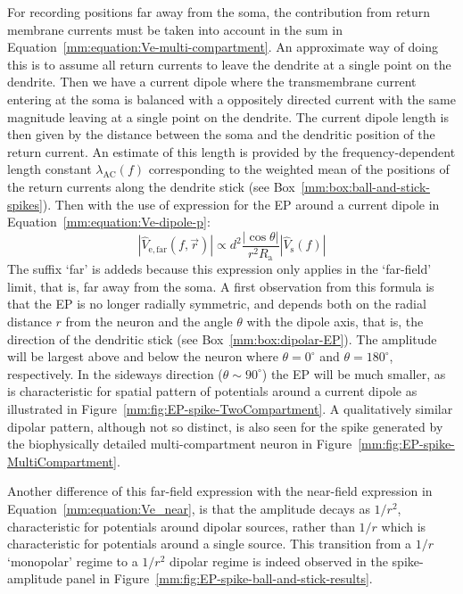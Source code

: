 For recording positions far away from the soma, the contribution from return membrane currents must be taken into
account in the sum in Equation~\ref{mm:equation:Ve-multi-compartment}. An approximate way of doing this is to
assume all return currents to leave the dendrite at a single point on the dendrite. Then we have 
a current dipole where the transmembrane current entering at the soma is balanced with a oppositely directed current
with the same magnitude leaving at a single point on the dendrite. The current dipole length is then given by the distance
between the soma and the dendritic position of the return current. An estimate of this length is provided by the 
frequency-dependent length constant  $\lambda_\mathrm{AC}(f)$  corresponding to the weighted mean of the positions of the return currents along
the dendrite stick (see Box~\ref{mm:box:ball-and-stick-spikes}). 
Then with the use of expression for the EP around a current dipole in 
Equation~\ref{mm:equation:Ve-dipole-p}:
\begin{equation}
  |\hat{V}_\mathrm{e,far}(f,\vec{r})|  \propto d^{2} \frac{|\cos \theta| }{r^2  R_\mathrm{a}}  |\hat{V}_\mathrm{s}(f)| 
  \label{mm:equation:Ve_far}
\end{equation}
The suffix `far' is addeds because this expression only applies in the `far-field' limit, that is,
far away from the soma. A first observation from this formula is that the EP is no longer radially symmetric, and depends both on the radial distance $r$ from the neuron and  the angle $\theta$ with the dipole axis, that is, the direction of the dendritic stick  (see Box~\ref{mm:box:dipolar-EP}). The amplitude will be largest
above and below the neuron where $\theta=0^\circ$ and $\theta=180^\circ$, respectively. In the sideways direction 
($\theta \sim 90^\circ$) the EP will be much smaller, as is characteristic for spatial pattern of potentials around a current
dipole as illustrated in Figure~\ref{mm:fig:EP-spike-TwoCompartment}. A qualitatively similar dipolar pattern, although not so distinct,
is also seen for the spike generated by the biophysically detailed multi-compartment neuron in Figure~\ref{mm:fig:EP-spike-MultiCompartment}.

Another difference of this far-field expression with the near-field expression in Equation~\ref{mm:equation:Ve_near}, is that the
amplitude decays as $1/r^2$, characteristic for potentials around dipolar sources, rather than $1/r$ which is characteristic for potentials around 
a single source. This transition from a $1/r$ `monopolar' regime to a $1/r^2$ dipolar regime is indeed observed in
the spike-amplitude panel in Figure~\ref{mm:fig:EP-spike-ball-and-stick-results}.

